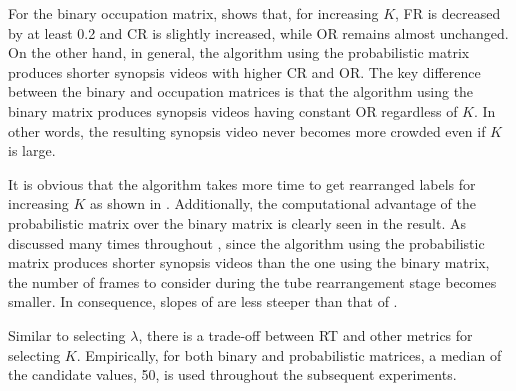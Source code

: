 \documentclass[11pt]{hyu_thesis}
\begin{document}
For the binary occupation matrix,  shows that, for increasing $K$, FR is decreased by at least 0.2 and CR is slightly increased, while OR remains almost unchanged. On the other hand, in general, the algorithm using the probabilistic matrix produces shorter synopsis videos with higher CR and OR. The key difference between the binary and occupation matrices is that the algorithm using the binary matrix produces synopsis videos having constant OR regardless of $K$. In other words, the resulting synopsis video never becomes more crowded even if $K$ is large.

It is obvious that the algorithm takes more time to get rearranged labels for increasing $K$ as shown in . Additionally, the computational advantage of the probabilistic matrix over the binary matrix is clearly seen in the result. As discussed many times throughout , since the algorithm using the probabilistic matrix produces shorter synopsis videos than the one using the binary matrix, the number of frames to consider during the tube rearrangement stage becomes smaller. In consequence, slopes of  are less steeper than that of .

Similar to selecting $\lambda$, there is a trade-off between RT and other metrics for selecting $K$. Empirically, for both binary and probabilistic matrices, a median of the candidate values, 50, is used throughout the subsequent experiments.

\tableQueueOne
{}\tableQueueTwo
{}\tableQueueThree
{}\tableQueueFour
{}\tableQueueFive

\tableProbQueueOne
{}\tableProbQueueTwo
{}\tableProbQueueThree
{}\tableProbQueueFour
{}\tableProbQueueFive
\end{document}
